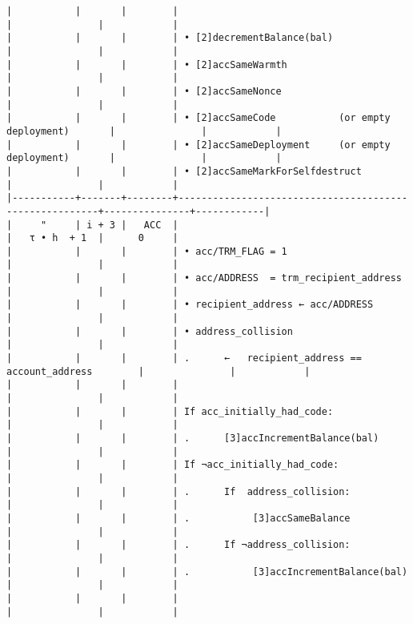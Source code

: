 \documentclass[varwidth=\maxdimen,margin=0.5cm,multi={verbatim}]{standalone}
\begin{document}
\begin{verbatim}
|           |       |        |                                                        |               |            |
|           |       |        | • [2]decrementBalance(bal)                             |               |            |
|           |       |        | • [2]accSameWarmth                                     |               |            |
|           |       |        | • [2]accSameNonce                                      |               |            |
|           |       |        | • [2]accSameCode           (or empty deployment)       |               |            |
|           |       |        | • [2]accSameDeployment     (or empty deployment)       |               |            |
|           |       |        | • [2]accSameMarkForSelfdestruct                        |               |            |
|-----------+-------+--------+--------------------------------------------------------+---------------+------------|
|     "     | i + 3 |   ACC  |                                                        |   τ • h  + 1  |      0     |
|           |       |        | • acc/TRM_FLAG = 1                                     |               |            |
|           |       |        | • acc/ADDRESS  = trm_recipient_address                 |               |            |
|           |       |        | • recipient_address ← acc/ADDRESS                      |               |            |
|           |       |        | • address_collision                                    |               |            |
|           |       |        | .      ←   recipient_address == account_address        |               |            |
|           |       |        |                                                        |               |            |
|           |       |        | If acc_initially_had_code:                             |               |            |
|           |       |        | .      [3]accIncrementBalance(bal)                     |               |            |
|           |       |        | If ¬acc_initially_had_code:                            |               |            |
|           |       |        | .      If  address_collision:                          |               |            |
|           |       |        | .           [3]accSameBalance                          |               |            |
|           |       |        | .      If ¬address_collision:                          |               |            |
|           |       |        | .           [3]accIncrementBalance(bal)                |               |            |
|           |       |        |                                                        |               |            |

\end{verbatim}
\end{document}
